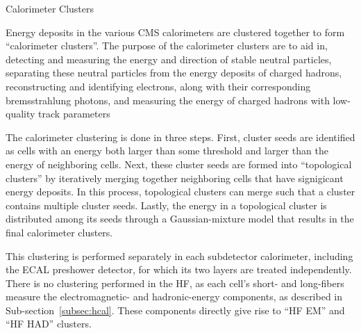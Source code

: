 \begin{section}{Calorimeter Clusters}

Energy deposits in the various CMS calorimeters are clustered together to form ``calorimeter clusters''.
The purpose of the calorimeter clusters are to aid in,  detecting and measuring the energy and direction of stable neutral particles, separating these neutral particles from the energy deposits of charged hadrons, reconstructing and identifying electrons, along with their corresponding bremsstrahlung photons, and measuring the energy of charged hadrons with low-quality track parameters

The calorimeter clustering is done in three steps. First, cluster seeds are identified as cells with an energy both larger than some threshold and larger than the energy of neighboring cells.
Next, these cluster seeds are formed into ``topological clusters'' by iteratively merging together neighboring cells that have signigicant energy deposits.
In this process, topological clusters can merge such that a cluster contains multiple cluster seeds.
Lastly, the energy in a topological cluster is distributed among its seeds through a Gaussian-mixture model that results in the final calorimeter clusters.

This clustering is performed separately in each subdetector calorimeter, including the ECAL preshower detector, for which its two layers are treated independently.
There is no clustering performed in the HF, as each cell's short- and long-fibers measure the electromagnetic- and hadronic-energy components, as described in Sub-section~\ref{subsec:hcal}.
These components directly give rise to ``HF EM'' and ``HF HAD'' clusters.

\end{section}

